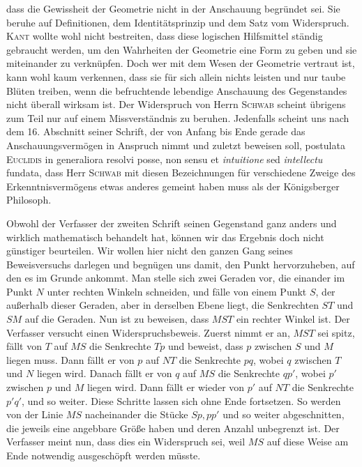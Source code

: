 %
dass die Gewissheit der Geometrie nicht in der Anschauung begründet sei. Sie beruhe auf Definitionen, dem Identitätsprinzip und dem Satz vom Widerspruch. \textsc{Kant} wollte wohl nicht bestreiten, dass diese logischen Hilfsmittel ständig gebraucht werden, um den Wahrheiten der Geometrie eine Form zu geben und sie miteinander zu verknüpfen. Doch wer mit dem Wesen der Geometrie vertraut ist, kann wohl kaum verkennen, dass sie für sich allein nichts leisten und nur taube Blüten treiben, wenn die befruchtende lebendige Anschauung des Gegenstandes nicht überall wirksam ist. Der Widerspruch von Herrn \textsc{Schwab} scheint übrigens zum Teil nur auf einem Missverständnis zu beruhen. Jedenfalls scheint uns nach dem 16. Abschnitt seiner Schrift, der von Anfang bis Ende gerade das Anschauungsvermögen in Anspruch nimmt und zuletzt beweisen soll, postulata \textsc{Euclidis} in generaliora resolvi posse, non sensu et \textit{intuitione} sed \textit{intellectu} fundata, dass Herr \textsc{Schwab} mit diesen Bezeichnungen für verschiedene Zweige des Erkenntnisvermögens etwas anderes gemeint haben muss als der Königsberger Philosoph.

Obwohl der Verfasser der zweiten Schrift seinen Gegenstand ganz anders und wirklich mathematisch behandelt hat, können wir das Ergebnis doch nicht günstiger beurteilen. Wir wollen hier nicht den ganzen Gang seines Beweisversuchs darlegen und begnügen uns damit, den Punkt hervorzuheben, auf den es im Grunde ankommt. Man stelle sich zwei Geraden vor, die einander im Punkt \(N\) unter rechten Winkeln schneiden, und fälle von einem Punkt \(S\), der außerhalb dieser Geraden, aber in derselben Ebene liegt, die Senkrechten \(ST\) und \(SM\) auf die Geraden. Nun ist zu beweisen, dass \(MST\) ein rechter Winkel ist. Der Verfasser versucht einen Widerspruchsbeweis. Zuerst nimmt er an, \(MST\) sei spitz, fällt von \(T\) auf \(MS\) die Senkrechte \(Tp\) und beweist, dass \(p\) zwischen \(S\) und \(M\) liegen muss. Dann fällt er von \(p\) auf \(NT\) die Senkrechte \(pq\), wobei \(q\) zwischen \(T\) und \(N\) liegen wird. Danach fällt er von \(q\) auf \(MS\) die Senkrechte \(qp'\), wobei \(p'\) zwischen \(p\) und \(M\) liegen wird. Dann fällt er wieder von \(p'\) auf \(NT\) die Senkrechte \(p'q'\), und so weiter. Diese Schritte lassen sich ohne Ende fortsetzen. So werden von der Linie \(MS\) nacheinander die Stücke \(Sp,pp'\) und so weiter abgeschnitten, die jeweils eine angebbare Größe haben und deren Anzahl unbegrenzt ist. Der Verfasser meint nun, dass dies ein Widerspruch sei, weil \(MS\) auf diese Weise am Ende notwendig ausgeschöpft werden müsste.
